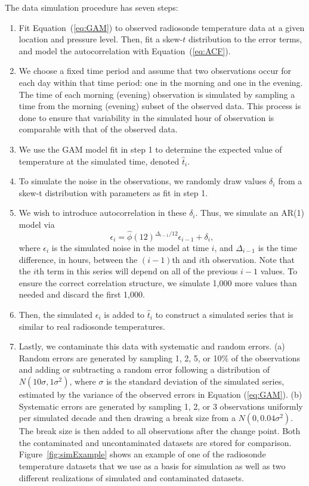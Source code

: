 \documentclass[12pt]{article}
\begin{document}
\begin{doublespacing}
The data simulation procedure has seven steps:
\begin{enumerate}
	\item Fit Equation~(\ref{eq:GAM}) to observed radiosonde temperature data at a given location and pressure level.  Then, fit a skew-$t$ distribution to the error terms, and model the autocorrelation with Equation~(\ref{eq:ACF}).
	\item We choose a fixed time period and assume that two observations occur for each day within that time period: one in the morning and one in the evening.  The time of each morning (evening) observation is simulated by sampling a time from the morning (evening) subset of the observed data.  This process is done to ensure that variability in the simulated hour of observation is comparable with that of the observed data.
	\item We use the GAM model fit in step 1 to determine the expected value of temperature at the simulated time, denoted $\hat t_i$.
	\item To simulate the noise in the observations, we randomly draw values $\delta_i$ from a skew-t distribution with parameters as fit in step 1.
	\item We wish to introduce autocorrelation in these $\delta_i$.  Thus, we simulate an AR(1) model via
	\begin{equation*}
	\epsilon_i = \widehat{\phi}(12)^{\Delta_{i-1}/12} \epsilon_{i-1} + \delta_i,
	\end{equation*}
	where $\epsilon_i$ is the simulated noise in the model at time $i$, and $\Delta_{i-1}$ is the time difference, in hours, between the $(i-1)$th and $i$th observation.  Note that the $i$th term in this series will depend on all of the previous $i-1$ values.  To ensure the correct correlation structure, we simulate 1,000 more values than needed and discard the first 1,000.
	\item Then, the simulated $\epsilon_i$ is added to $\hat{t}_i$ to construct a simulated series that is similar to real radiosonde temperatures.

	\item Lastly, we contaminate this data with systematic and random errors.  (a) Random errors are generated by sampling 1, 2, 5, or 10\% of the observations and adding or subtracting a random error following a distribution of $N(10\sigma,1\sigma^2)$, where $\sigma$ is the standard deviation of the simulated series, estimated by the variance of the observed errors in Equation (\ref{eq:GAM}).  (b) Systematic errors are generated by sampling 1, 2, or 3 observations uniformly per simulated decade and then drawing a break size from a $N(0,0.04 \sigma^2)$.  The break size is then added to all observations after the change point.  Both the contaminated and uncontaminated datasets are stored for comparison.  Figure~\ref{fig:simExample} shows an example of one of the radiosonde temperature datasets that we use as a basis for simulation as well as two different realizations of simulated and contaminated datasets.
\end{enumerate}


\end{doublespacing}
\end{document}
